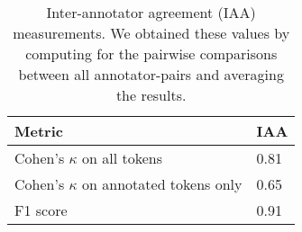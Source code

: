 \documentclass[../report.tex]{subfiles}
\begin{document}
\begin{table}[t]
\begin{tabular}{@{}p{6cm}p{1.25cm}@{}}
\toprule
Metric &  IAA  \\ \midrule
Cohen's $\kappa$ on all tokens & 0.81 \\ 
Cohen's $\kappa$ on annotated tokens only & 0.65 \\
F1 score & 0.91 \\ \bottomrule
\end{tabular}
\caption{
    Inter-annotator agreement (IAA) measurements.
    We obtained these values by computing for the pairwise comparisons between all annotator-pairs and averaging the results.
}
\label{table:iaa}
\end{table}
\end{document}
